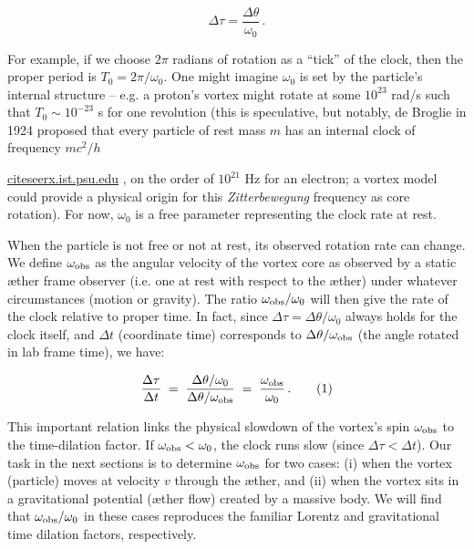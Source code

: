 \documentclass[aps,preprint,superscriptaddress]{revtex4}
\begin{document}
 \begin{equation}
\Delta \tau = \frac{\Delta \theta}{\omega_0} \,.
 \end{equation}

For example, if we choose $2\pi$ radians of rotation as a “tick” of the clock, then the proper period is $T_0 = 2\pi/\omega_0$. One might imagine $\omega_0$ is set by the particle’s internal structure – e.g. a proton’s vortex might rotate at some $10^{23}$ rad/s such that $T_0 \sim 10^{-23}$ s for one revolution (this is speculative, but notably, de Broglie in 1924 proposed that every particle of rest mass $m$ has an internal clock of frequency $mc^2/h$

\href{https://citeseerx.ist.psu.edu/document?repid=rep1&type=pdf&doi=25483f1ebc9dc442a9f1505a49d96eb35e92e3f4#:~:text=al,related%20to%20this%20hypothesis%2C%20including}{citeseerx.ist.psu.edu}
, on the order of $10^{21}$ Hz for an electron; a vortex model could provide a physical origin for this \textit{Zitterbewegung} frequency as core rotation). For now, $\omega_0$ is a free parameter representing the clock rate at rest.

When the particle is not free or not at rest, its observed rotation rate can change. We define $\omega_{\rm obs}$ as the angular velocity of the vortex core as observed by a static æther frame observer (i.e. one at rest with respect to the æther) under whatever circumstances (motion or gravity). The ratio $\omega_{\rm obs}/\omega_0$ will then give the rate of the clock relative to proper time. In fact, since $\Delta \tau = \Delta \theta/\omega_0$ always holds for the clock itself, and $\Delta t$ (coordinate time) corresponds to $\Delta \theta/\omega_{\rm obs}$ (the angle rotated in lab frame time), we have:

 \begin{equation}
\frac{\Delta \tau}{\Delta t} \;=\; \frac{\Delta \theta/\omega_0}{\Delta \theta/\omega_{\rm obs}} \;=\; \frac{\omega_{\rm obs}}{\omega_0} \,. \tag{1}
 \end{equation}

This important relation links the physical slowdown of the vortex’s spin $\omega_{\rm obs}$ to the time-dilation factor. If $\omega_{\rm obs} < \omega_0$, the clock runs slow (since $\Delta \tau < \Delta t$). Our task in the next sections is to determine $\omega_{\rm obs}$ for two cases: (i) when the vortex (particle) moves at velocity $v$ through the æther, and (ii) when the vortex sits in a gravitational potential (æther flow) created by a massive body. We will find that $\omega_{\rm obs}/\omega_0$ in these cases reproduces the familiar Lorentz and gravitational time dilation factors, respectively.
\end{document}
